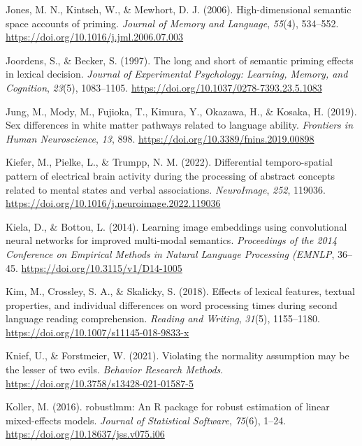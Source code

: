 \documentclass[
  12pt,
  man,floatsintext]{apa7}
\newlength{\cslhangindent}
\newlength{\cslentryspacingunit} %
\newenvironment{CSLReferences}[2] %
 {%
  \setlength{\parindent}{0pt}
  \ifodd #1
  \let\oldpar\par
  \def\par{\hangindent=\cslhangindent\oldpar}
  \fi
  \setlength{\parskip}{#2\cslentryspacingunit}
 }%
 {}
\begin{document}
\begin{CSLReferences}{1}{0}
\leavevmode{}%
Jones, M. N., Kintsch, W., \& Mewhort, D. J. (2006). High-dimensional semantic space accounts of priming. \emph{Journal of Memory and Language}, \emph{55}(4), 534--552. \url{https://doi.org/10.1016/j.jml.2006.07.003}

\leavevmode{}%
Joordens, S., \& Becker, S. (1997). The long and short of semantic priming effects in lexical decision. \emph{Journal of Experimental Psychology: Learning, Memory, and Cognition}, \emph{23}(5), 1083--1105. \url{https://doi.org/10.1037/0278-7393.23.5.1083}

\leavevmode{}%
Jung, M., Mody, M., Fujioka, T., Kimura, Y., Okazawa, H., \& Kosaka, H. (2019). Sex differences in white matter pathways related to language ability. \emph{Frontiers in Human Neuroscience}, \emph{13}, 898. \url{https://doi.org/10.3389/fnins.2019.00898}

\leavevmode{}%
Kiefer, M., Pielke, L., \& Trumpp, N. M. (2022). Differential temporo-spatial pattern of electrical brain activity during the processing of abstract concepts related to mental states and verbal associations. \emph{NeuroImage}, \emph{252}, 119036. \url{https://doi.org/10.1016/j.neuroimage.2022.119036}

\leavevmode{}%
Kiela, D., \& Bottou, L. (2014). Learning image embeddings using convolutional neural networks for improved multi-modal semantics. \emph{Proceedings of the 2014 Conference on Empirical Methods in Natural Language Processing ({EMNLP}}, 36--45. \url{https://doi.org/10.3115/v1/D14-1005}

\leavevmode{}%
Kim, M., Crossley, S. A., \& Skalicky, S. (2018). Effects of lexical features, textual properties, and individual differences on word processing times during second language reading comprehension. \emph{Reading and Writing}, \emph{31}(5), 1155--1180. \url{https://doi.org/10.1007/s11145-018-9833-x}

\leavevmode{}%
Knief, U., \& Forstmeier, W. (2021). Violating the normality assumption may be the lesser of two evils. \emph{Behavior Research Methods}. \url{https://doi.org/10.3758/s13428-021-01587-5}

\leavevmode{}%
Koller, M. (2016). {robustlmm}: An {R} package for robust estimation of linear mixed-effects models. \emph{Journal of Statistical Software}, \emph{75}(6), 1--24. \url{https://doi.org/10.18637/jss.v075.i06}


\end{CSLReferences}
\end{document}
